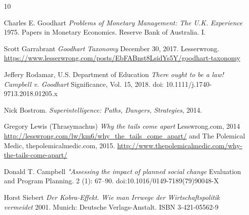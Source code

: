 \documentclass[10pt]{article}
\begin{document}
\begin{thebibliography}{10}

Charles E. Goodhart
\textit{Problems of Monetary Management: The U.K. Experience}
1975. Papers in Monetary Economics. Reserve Bank of Australia. I.

Scott Garrabrant
\textit{Goodhart Taxonomy}
December 30, 2017. Lesserwrong. \url{https://www.lesserwrong.com/posts/EbFABnst8LsidYs5Y/goodhart-taxonomy}

Jeffery Rodamar, U.S. Department of Education
\textit{There ought to be a law! Campbell v. Goodhart}
Significance, Vol. 15, 2018. doi: 10.1111/j.1740-9713.2018.01205.x
 
Nick Bostrom.
\textit{Superintelligence: Paths, Dangers, Strategies}, 2014.

Gregory Lewis (Thrasymachus)
\textit{Why the tails come apart}
 Lesswrong.com, 2014 \url{http://lesswrong.com/lw/km6/why_the_tails_come_apart/} and The Polemical Medic, thepolemicalmedic.com, 2015.  \url{http://www.thepolemicalmedic.com/why-the-tails-come-apart/} 

 Donald T. Campbell
\textit{"Assessing the impact of planned social change}
Evaluation and Program Planning. 2 (1): 67–90. doi:10.1016/0149-7189(79)90048-X

Horst Siebert
 \textit{Der Kobra-Effekt. Wie man Irrwege der Wirtschaftspolitik vermeidet}
2001. Munich: Deutsche Verlags-Anstalt. ISBN 3-421-05562-9
\end{thebibliography}
\end{document}
